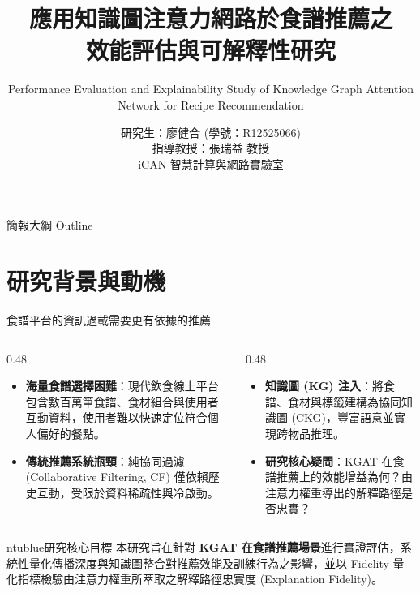 \documentclass[aspectratio=169, 10pt]{beamer}
\title{\fontsize{22}{26}\selectfont\bfseries 應用知識圖注意力網路於食譜推薦之\\ 效能評估與可解釋性研究}
\subtitle{\small Performance Evaluation and Explainability Study of Knowledge Graph Attention Network for Recipe Recommendation}
\author{\small 研究生：廖健合 \quad (學號：R12525066)\\[0.15cm]指導教授：張瑞益 教授\\[0.15cm]iCAN 智慧計算與網路實驗室}
\date{}
\begin{document}
\inserttitlepage

\begin{frame}{簡報大綱 Outline}
  \tableofcontents
\end{frame}

\section{研究背景與動機}

\begin{frame}[t]{食譜平台的資訊過載需要更有依據的推薦}
  \begin{columns}[t]
    \begin{column}{0.48\textwidth}
      \small
      \begin{itemize}
        \item \alert{\textbf{海量食譜選擇困難}}：現代飲食線上平台包含數百萬筆食譜、食材組合與使用者互動資料，使用者難以快速定位符合個人偏好的餐點。
        \item \alert{\textbf{傳統推薦系統瓶頸}}：純協同過濾 (Collaborative Filtering, CF) 僅依賴歷史互動，受限於資料稀疏性與冷啟動。
      \end{itemize}
    \end{column}
    
    \begin{column}{0.48\textwidth}
      \small
      \begin{itemize}
        \item \alert{\textbf{知識圖 (KG) 注入}}：將食譜、食材與標籤建構為協同知識圖 (CKG)，豐富語意並實現跨物品推理。
        \item \alert{\textbf{研究核心疑問}}：KGAT 在食譜推薦上的效能增益為何？由注意力權重導出的解釋路徑是否忠實？
      \end{itemize}
    \end{column}
  \end{columns}
  
  \vspace{0.1cm}
  \begin{mybox}{ntublue}{研究核心目標}
    \small 本研究旨在針對 \textbf{KGAT 在食譜推薦場景}進行實證評估，系統性量化傳播深度與知識圖整合對推薦效能及訓練行為之影響，並以 Fidelity 量化指標檢驗由注意力權重所萃取之解釋路徑忠實度 (Explanation Fidelity)。
  \end{mybox}
\end{frame}
\end{document}
